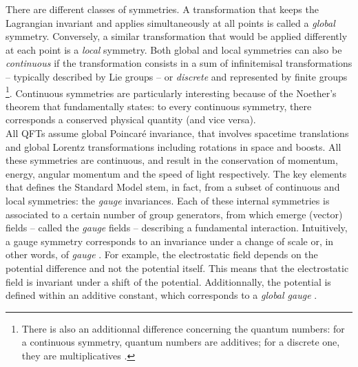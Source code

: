 There are different classes of symmetries. A transformation that keeps the Lagrangian invariant and applies simultaneously at all points is called a \textit{global} symmetry. Conversely, a similar transformation that would be applied differently at each point is a \textit{local} symmetry. Both global and local symmetries can also be \textit{continuous} if the transformation consists in a sum of infinitemisal transformations -- typically described by Lie groups -- or \textit{discrete} and represented by finite groups \cite{peskinIntroductionQuantumField2018}\footnote{There is also an additionnal difference concerning the quantum numbers: for a continuous symmetry, quantum numbers are additives; for a discrete one, they are multiplicatives \cite{braibantParticlesFundamentalInteractions2012}.}. Continuous symmetries are particularly interesting because of the Noether's theorem \cite{noetherInvariantVariationProblems1971} that fundamentally states: to every continuous symmetry, there corresponds a conserved physical quantity (and vice versa).\\

All QFTs assume global Poincaré invariance, that involves spacetime translations and global Lorentz transformations including rotations in space and boosts. All these symmetries are continuous, and result in the conservation of momentum, energy, angular momentum and the speed of light respectively. The key elements that defines the Standard Model stem, in fact, from a subset of continuous and local symmetries: the \textit{gauge} invariances. Each of these internal symmetries is associated to a certain number of group generators, from which emerge (vector) fields -- called the \textit{gauge} fields --
describing a fundamental interaction. Intuitively, a gauge symmetry corresponds to an invariance under a change of scale or, in other words, of \textit{gauge} \cite{merriam-websterDefinitionGAUGE2023}. For example, the electrostatic field depends on the potential difference and not the potential itself. This means that the electrostatic field is invariant under a shift of the potential. Additionnally, the potential is defined within an additive constant, which corresponds to a \textit{global gauge} \cite{braibantParticlesFundamentalInteractions2012}.

